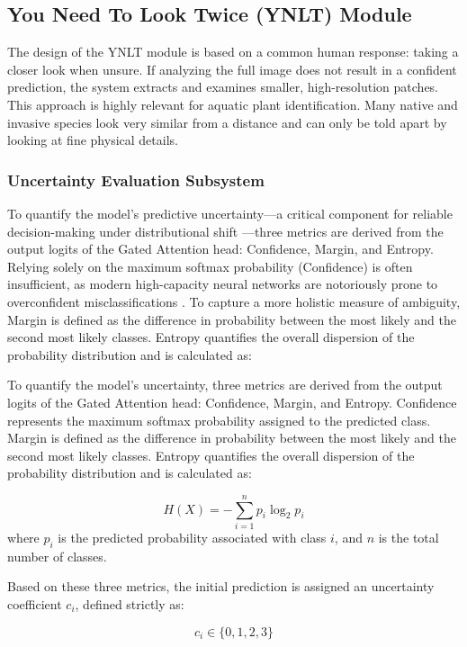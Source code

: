 \documentclass[final,3p,times,twocolumn]{elsarticle}
\begin{document}
\subsection{You Need To Look Twice (YNLT) Module}

The design of the YNLT module is based on a common human response: taking a closer look when unsure. If analyzing the full image does not result in a confident prediction, the system extracts and examines smaller, high-resolution patches. This approach is highly relevant for aquatic plant identification. Many native and invasive species look very similar from a distance and can only be told apart by looking at fine physical details.

\subsubsection{Uncertainty Evaluation Subsystem}

To quantify the model's predictive uncertainty—a critical component for reliable decision-making under distributional shift \cite{Ovadiaetal2019}—three metrics are derived from the output logits of the Gated Attention head: Confidence, Margin, and Entropy. Relying solely on the maximum softmax probability (Confidence) is often insufficient, as modern high-capacity neural networks are notoriously prone to overconfident misclassifications \cite{Guoetal2017}. To capture a more holistic measure of ambiguity, Margin is defined as the difference in probability between the most likely and the second most likely classes. Entropy quantifies the overall dispersion of the probability distribution and is calculated as:

To quantify the model's uncertainty, three metrics are derived from the output logits of the Gated Attention head: Confidence, Margin, and Entropy. Confidence represents the maximum softmax probability assigned to the predicted class. Margin is defined as the difference in probability between the most likely and the second most likely classes. Entropy quantifies the overall dispersion of the probability distribution and is calculated as:

\[
H(X) = -\sum_{i=1}^n p_i \log_2 p_i
\]
where \( p_i \) is the predicted probability associated with class \( i \), and \( n \) is the total number of classes.

Based on these three metrics, the initial prediction is assigned an uncertainty coefficient \( c_i \), defined strictly as:

\[
c_i \in \{0, 1, 2, 3\}
\]
\end{document}
